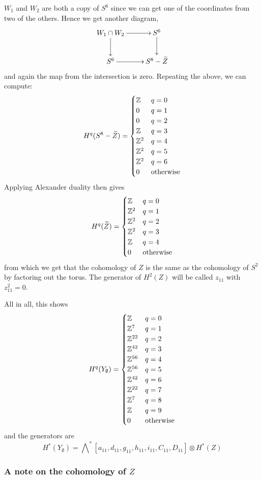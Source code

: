 $W_1$ and $W_2$ are both a copy of $S^6$ since we can get one of
the coordinates from two of the others. Hence we get another diagram,
\[ \xymatrix{
  W_1\cap W_2 \ar[r]\ar[d] & S^6 \ar[d] \\
  S^6 \ar[r] & S^8-\widetilde Z
} \]
and again the map from the intersection is zero. Repeating the above,
we can compute:
\[ H^q(S^8-\widetilde Z) =
\begin{cases}
  \mathbb{Z} & q = 0 \\
  0 & q = 1 \\
  0 & q = 2 \\
  \mathbb{Z} & q = 3 \\
  \mathbb{Z}^2 & q = 4 \\
  \mathbb{Z}^2 & q = 5 \\
  \mathbb{Z}^2 & q =6 \\
  0 & \text{otherwise}
\end{cases} \]
Applying Alexander duality then gives
\[ H^q(\widetilde Z) =
\begin{cases}
  \mathbb{Z} & q = 0 \\
  \mathbb{Z}^2 & q = 1 \\
  \mathbb{Z}^2 & q = 2 \\
  \mathbb{Z}^2 & q = 3 \\
  \mathbb{Z} & q = 4 \\
  0 & \text{otherwise}
\end{cases} \]
from which we get that the cohomology of $Z$ is the same as the
cohomology of $S^2$ by factoring out the torus. The generator of
$H^2(Z)$ will be called $z_{11}$ with $z_{11}^2 = 0$.

All in all, this shows
\[ H^q(Y_{\emptyset}) =
  \begin{cases}
    \mathbb{Z} & q = 0 \\
    \mathbb{Z}^7 & q = 1 \\
    \mathbb{Z}^{22} & q = 2 \\
    \mathbb{Z}^{42} & q = 3 \\
    \mathbb{Z}^{56} & q = 4 \\
    \mathbb{Z}^{56} & q = 5 \\
    \mathbb{Z}^{42} & q = 6 \\
    \mathbb{Z}^{22} & q = 7 \\
    \mathbb{Z}^{7} & q = 8 \\
    \mathbb{Z} & q = 9 \\
    0 & \text{otherwise}
  \end{cases} \] 
and the generators are
\[ H^*(Y_{\emptyset}) =
\bigwedge\nolimits^*[a_{11},d_{11},g_{11},h_{11},i_{11},C_{11},D_{11}]
\otimes H^*(Z) \]

\subsubsection{A note on the cohomology of $Z$}


